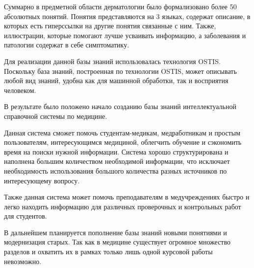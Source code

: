 Суммарно в предметной области дерматологии было формализовано более 50 абсолютных понятий. Понятия представляются на 3 языках, содержат описание, в которых есть гиперссылки на другие понятия связанные с ним. Также, иллюстрации, которые помогают лучше усваивать информацию, а заболевания и патологии содержат в себе симптоматику.

Для реализации данной базы знаний использовалась технология OSTIS. Поскольку база знаний, построенная по технологии OSTIS, может описывать любой вид знаний, удобна как для машинной обработки, так и восприятия человеком. 

В результате было положено начало созданию базы знаний интеллектуальной справочной системы по медицине.

Данная система сможет помочь студентам-медикам, медработникам и простым пользователям, интересующимся медициной, облегчить обучение и сэкономить время на поиски нужной информации. Система хорошо структурирована и наполнена большим количеством необходимой информации, что исключает необходимость использования большого количества разных источников по интересующему вопросу.

Также данная система может помочь преподавателям в медучреждениях быстро и легко находить информацию для различных проверочных  и контрольных работ для студентов. 

В дальнейшем планируется пополнение базы знаний новыми понятиями и модернизация старых. Так как в медицине существует огромное множество разделов и охватить их в рамках только лишь одной курсовой работы невозможно.

